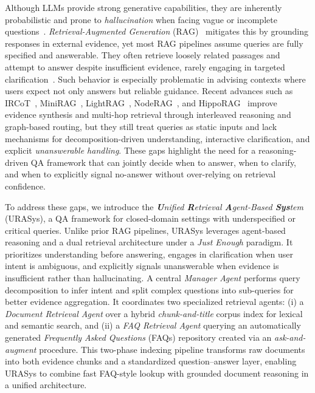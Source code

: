 \documentclass[11pt]{article}
\begin{document}
Although LLMs provide strong generative capabilities, they are inherently probabilistic and prone to \textit{hallucination} when facing vague or incomplete questions~\cite{li-etal-2024-dawn}. \textit{Retrieval-Augmented Generation} (RAG)~\cite{10.5555/3495724.3496517} mitigates this by grounding responses in external evidence, yet most RAG pipelines assume queries are fully specified and answerable. They often retrieve loosely related passages and attempt to answer despite insufficient evidence, rarely engaging in targeted clarification~\cite{10.1145/3637528.3671470}. Such behavior is especially problematic in advising contexts where users expect not only answers but reliable guidance. Recent advances such as IRCoT~\cite{trivedi-etal-2023-interleaving}, MiniRAG~\cite{fan2025minirag}, LightRAG~\cite{guo2024lightrag}, NodeRAG~\cite{xu2025noderag}, and HippoRAG~\cite{liu2025hoprag} improve evidence synthesis and multi-hop retrieval through interleaved reasoning and graph-based routing, but they still treat queries as static inputs and lack mechanisms for decomposition-driven understanding, interactive clarification, and explicit \textit{unanswerable handling}. These gaps highlight the need for a reasoning-driven QA framework that can jointly decide when to answer, when to clarify, and when to explicitly signal no-answer without over-relying on retrieval confidence.



To address these gaps, we introduce the \textit{\textbf{U}nified \textbf{R}etrieval \textbf{A}gent-Based \textbf{Sys}tem} (URASys), a QA framework for closed-domain settings with underspecified or critical queries. Unlike prior RAG pipelines, URASys leverages agent-based reasoning and a dual retrieval architecture under a \textit{Just Enough} paradigm. It prioritizes understanding before answering, engages in clarification when user intent is ambiguous, and explicitly signals unanswerable when evidence is insufficient rather than hallucinating. A central \textit{Manager Agent} performs query decomposition to infer intent and split complex questions into sub-queries for better evidence aggregation. It coordinates two specialized retrieval agents: (i) a \textit{Document Retrieval Agent} over a hybrid \textit{chunk-and-title} corpus index for lexical and semantic search, and (ii) a \textit{FAQ Retrieval Agent} querying an automatically generated \textit{Frequently Asked Questions} (FAQs) repository created via an \textit{ask-and-augment} procedure. This two-phase indexing pipeline transforms raw documents into both evidence chunks and a standardized question–answer layer, enabling URASys to combine fast FAQ-style lookup with grounded document reasoning in a unified architecture.
\end{document}
